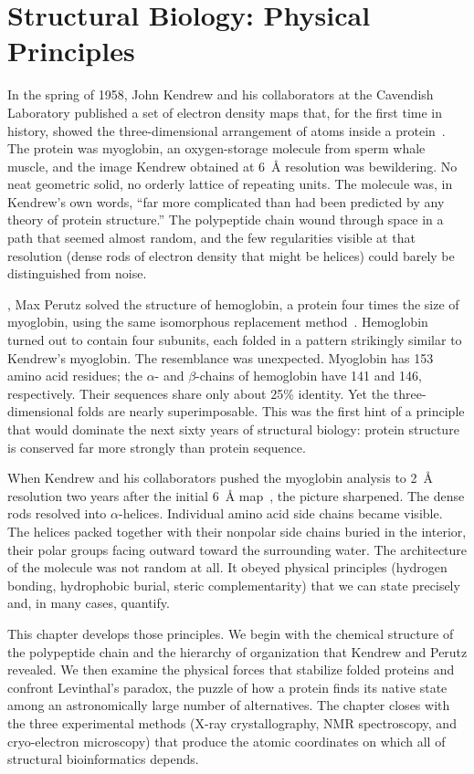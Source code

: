 \chapter{Structural Biology: Physical Principles}
\label{ch:foundations}

In the spring of 1958, John Kendrew and his collaborators at the Cavendish Laboratory published a set of electron density maps that, for the first time in history, showed the three-dimensional arrangement of atoms inside a protein~\cite{kendrew1958}.  The protein was myoglobin, an oxygen-storage molecule from sperm whale muscle, and the image Kendrew obtained at 6~\AA{} resolution was bewildering.  No neat geometric solid, no orderly lattice of repeating units.  The molecule was, in Kendrew's own words, ``far more complicated than had been predicted by any theory of protein structure.''  The polypeptide chain wound through space in a path that seemed almost random, and the few regularities visible at that resolution (dense rods of electron density that might be helices) could barely be distinguished from noise.

, Max Perutz solved the structure of hemoglobin, a protein four times the size of myoglobin, using the same isomorphous replacement method~\cite{perutz1960}.  Hemoglobin turned out to contain four subunits, each folded in a pattern strikingly similar to Kendrew's myoglobin.  The resemblance was unexpected. Myoglobin has 153 amino acid residues; the $\alpha$- and $\beta$-chains of hemoglobin have 141 and 146, respectively.  Their sequences share only about 25\% identity.  Yet the three-dimensional folds are nearly superimposable.  This was the first hint of a principle that would dominate the next sixty years of structural biology: protein structure is conserved far more strongly than protein sequence.

When Kendrew and his collaborators pushed the myoglobin analysis to 2~\AA{} resolution two years after the initial 6~\AA{} map~\cite{kendrew1960}, the picture sharpened.  The dense rods resolved into $\alpha$-helices.  Individual amino acid side chains became visible.  The helices packed together with their nonpolar side chains buried in the interior, their polar groups facing outward toward the surrounding water.  The architecture of the molecule was not random at all.  It obeyed physical principles (hydrogen bonding, hydrophobic burial, steric complementarity) that we can state precisely and, in many cases, quantify.

This chapter develops those principles.  We begin with the chemical structure of the polypeptide chain and the hierarchy of organization that Kendrew and Perutz revealed.  We then examine the physical forces that stabilize folded proteins and confront Levinthal's paradox, the puzzle of how a protein finds its native state among an astronomically large number of alternatives.  The chapter closes with the three experimental methods (X-ray crystallography, NMR spectroscopy, and cryo-electron microscopy) that produce the atomic coordinates on which all of structural bioinformatics depends.

